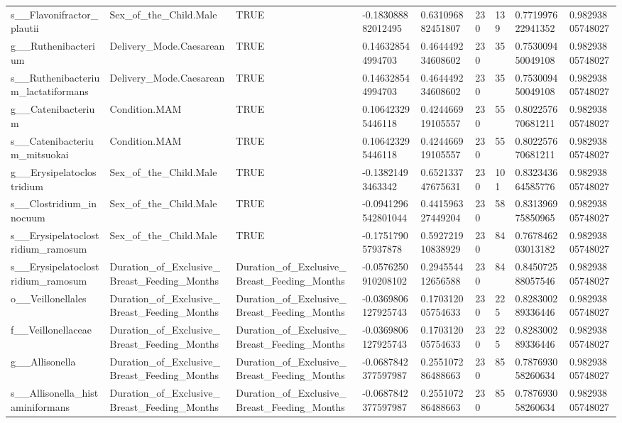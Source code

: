 \begin{longtable}{lllllllll}
s\_\_Flavonifractor\_plautii & Sex\_of\_the\_Child.Male & TRUE & -0.183088882012495 & 0.631096882451807 & 230 & 139 & 0.771997622941352 & 0.98293805748027 \\
g\_\_Ruthenibacterium & Delivery\_Mode.Caesarean & TRUE & 0.146328544994703 & 0.464449234608602 & 230 & 35 & 0.753009450049108 & 0.98293805748027 \\
s\_\_Ruthenibacterium\_lactatiformans & Delivery\_Mode.Caesarean & TRUE & 0.146328544994703 & 0.464449234608602 & 230 & 35 & 0.753009450049108 & 0.98293805748027 \\
g\_\_Catenibacterium & Condition.MAM & TRUE & 0.106423295446118 & 0.424466919105557 & 230 & 55 & 0.802257670681211 & 0.98293805748027 \\
s\_\_Catenibacterium\_mitsuokai & Condition.MAM & TRUE & 0.106423295446118 & 0.424466919105557 & 230 & 55 & 0.802257670681211 & 0.98293805748027 \\
g\_\_Erysipelatoclostridium & Sex\_of\_the\_Child.Male & TRUE & -0.13821493463342 & 0.652133747675631 & 230 & 101 & 0.832343664585776 & 0.98293805748027 \\
s\_\_Clostridium\_innocuum & Sex\_of\_the\_Child.Male & TRUE & -0.0941296542801044 & 0.441596327449204 & 230 & 58 & 0.831396975850965 & 0.98293805748027 \\
s\_\_Erysipelatoclostridium\_ramosum & Sex\_of\_the\_Child.Male & TRUE & -0.175179057937878 & 0.592721910838929 & 230 & 84 & 0.767846203013182 & 0.98293805748027 \\
s\_\_Erysipelatoclostridium\_ramosum & Duration\_of\_Exclusive\_Breast\_Feeding\_Months & Duration\_of\_Exclusive\_Breast\_Feeding\_Months & -0.0576250910208102 & 0.294554412656588 & 230 & 84 & 0.845072588057546 & 0.98293805748027 \\
o\_\_Veillonellales & Duration\_of\_Exclusive\_Breast\_Feeding\_Months & Duration\_of\_Exclusive\_Breast\_Feeding\_Months & -0.0369806127925743 & 0.170312005754633 & 230 & 225 & 0.828300289336446 & 0.98293805748027 \\
f\_\_Veillonellaceae & Duration\_of\_Exclusive\_Breast\_Feeding\_Months & Duration\_of\_Exclusive\_Breast\_Feeding\_Months & -0.0369806127925743 & 0.170312005754633 & 230 & 225 & 0.828300289336446 & 0.98293805748027 \\
g\_\_Allisonella & Duration\_of\_Exclusive\_Breast\_Feeding\_Months & Duration\_of\_Exclusive\_Breast\_Feeding\_Months & -0.0687842377597987 & 0.255107286488663 & 230 & 85 & 0.787693058260634 & 0.98293805748027 \\
s\_\_Allisonella\_histaminiformans & Duration\_of\_Exclusive\_Breast\_Feeding\_Months & Duration\_of\_Exclusive\_Breast\_Feeding\_Months & -0.0687842377597987 & 0.255107286488663 & 230 & 85 & 0.787693058260634 & 0.98293805748027 \\

\end{longtable}
